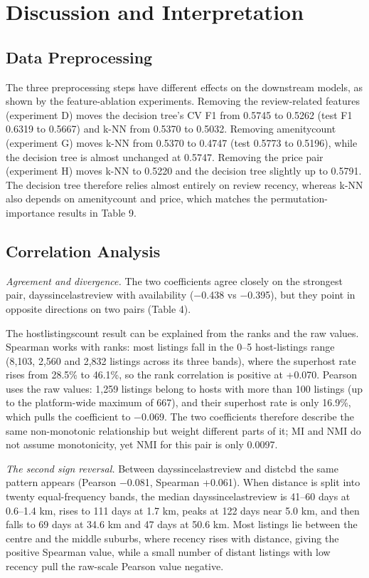 \documentclass[final,1p,11pt]{elsarticle}
\renewcommand\_{\textunderscore\allowbreak}%
\begin{document}
\section{Discussion and Interpretation}

\subsection{Data Preprocessing}

The three preprocessing steps have different effects on the downstream models, as shown by the feature-ablation experiments. Removing the review-related features (experiment D) moves the decision tree’s CV F1 from 0.5745 to 0.5262 (test F1 0.6319 to 0.5667) and k-NN from 0.5370 to 0.5032. Removing amenity\_count (experiment G) moves k-NN from 0.5370 to 0.4747 (test 0.5773 to 0.5196), while the decision tree is almost unchanged at 0.5747. Removing the price pair (experiment H) moves k-NN to 0.5220 and the decision tree slightly up to 0.5791. The decision tree therefore relies almost entirely on review recency, whereas k-NN also depends on amenity\_count and price, which matches the permutation-importance results in Table 9.

\subsection{Correlation Analysis}

\textit{Agreement and divergence.} The two coefficients agree closely on the strongest pair, days\_since\_last\_review with availability\_365 (−0.438 vs −0.395), but they point in opposite directions on two pairs (Table 4).

The host\_listings\_count result can be explained from the ranks and the raw values. Spearman works with ranks: most listings fall in the 0–5 host-listings range (8,103, 2,560 and 2,832 listings across its three bands), where the superhost rate rises from 28.5\% to 46.1\%, so the rank correlation is positive at +0.070. Pearson uses the raw values: 1,259 listings belong to hosts with more than 100 listings (up to the platform-wide maximum of 667), and their superhost rate is only 16.9\%, which pulls the coefficient to −0.069. The two coefficients therefore describe the same non-monotonic relationship but weight different parts of it; MI and NMI do not assume monotonicity, yet NMI for this pair is only 0.0097.

\textit{The second sign reversal.} Between days\_since\_last\_review and dist\_cbd the same pattern appears (Pearson −0.081, Spearman +0.061). When distance is split into twenty equal-frequency bands, the median days\_since\_last\_review is 41–60 days at 0.6–1.4 km, rises to 111 days at 1.7 km, peaks at 122 days near 5.0 km, and then falls to 69 days at 34.6 km and 47 days at 50.6 km. Most listings lie between the centre and the middle suburbs, where recency rises with distance, giving the positive Spearman value, while a small number of distant listings with low recency pull the raw-scale Pearson value negative.
\end{document}
